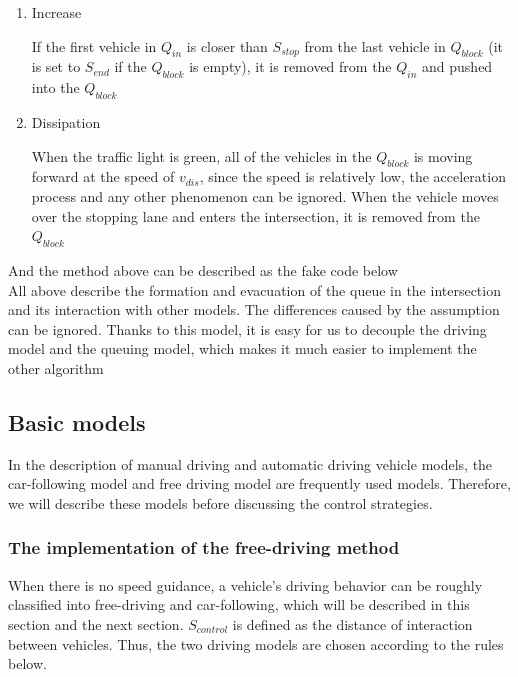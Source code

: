 \documentclass[a4paper,UTF8]{paper}
\begin{document}
\begin{enumerate}
\item Increase

If the first vehicle in $Q_{in}$ is closer than $S_{stop}$ from the last vehicle in $Q_{block}$ (it is set to $S_{end}$ if the $Q_{block}$ is empty), it is removed from the $Q_{in}$ and pushed into the $Q_{block}$

\item Dissipation

When the traffic light is green, all of the vehicles in the $Q_{block}$ is moving forward at the speed of $v_{dis}$, since the speed is relatively low, the acceleration process and any other phenomenon can be ignored. When the vehicle moves over the stopping lane and enters the intersection, it is removed from the $Q_{block}$
\end{enumerate}
And the method above can be described as the fake code below\\



All above describe the formation and evacuation of the queue in the intersection and its interaction with other models. The differences caused by the assumption can be ignored. Thanks to this model, it is easy for us to decouple the driving model and the queuing model, which makes it much easier to implement the other algorithm
\subsection{Basic models}
In the description of manual driving and automatic driving vehicle models, the car-following model and free driving model are frequently used models. Therefore, we will describe these models before discussing the control strategies.

\subsubsection{The implementation of the free-driving method}

When there is no speed guidance, a vehicle's driving behavior can be roughly classified into free-driving and car-following, which will be described in this section and the next section. $S_{control}$ is defined as the distance of interaction between vehicles. Thus, the two driving models are chosen according to the rules below.
\end{document}
